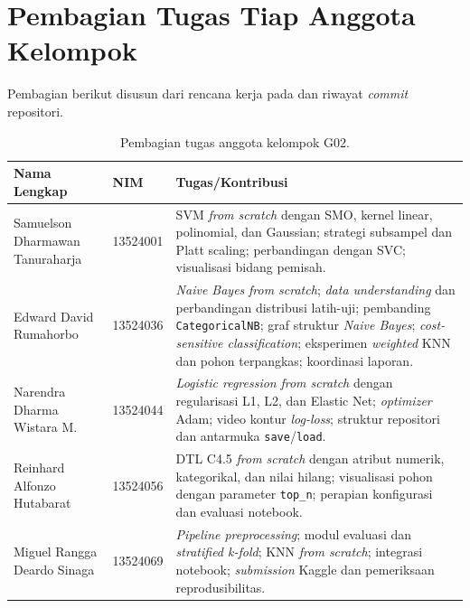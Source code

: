 \pagebreak
\section{Pembagian Tugas Tiap Anggota Kelompok}
Pembagian berikut disusun dari rencana kerja pada  dan riwayat \textit{commit} repositori.
\begin{table}[ht]
    \centering
    \small
    \renewcommand{\arraystretch}{1.4}
    \begin{tabularx}{\textwidth}{@{}p{4.6cm}lX@{}}
        \toprule
        \textbf{Nama Lengkap} & \textbf{NIM} & \textbf{Tugas/Kontribusi} \\
        \midrule
        Samuelson Dharmawan Tanuraharja & 13524001 & SVM \textit{from scratch} dengan SMO, kernel linear, polinomial, dan Gaussian; strategi subsampel dan Platt scaling; perbandingan dengan SVC; visualisasi bidang pemisah. \\
        Edward David Rumahorbo & 13524036 & \textit{Naive Bayes} \textit{from scratch}; \textit{data understanding} dan perbandingan distribusi latih-uji; pembanding \texttt{CategoricalNB}; graf struktur \textit{Naive Bayes}; \textit{cost-sensitive classification}; eksperimen \textit{weighted} KNN dan pohon terpangkas; koordinasi laporan. \\
        Narendra Dharma Wistara M. & 13524044 & \textit{Logistic regression} \textit{from scratch} dengan regularisasi L1, L2, dan Elastic Net; \textit{optimizer} Adam; video kontur \textit{log-loss}; struktur repositori dan antarmuka \texttt{save}/\texttt{load}. \\
        Reinhard Alfonzo Hutabarat & 13524056 & DTL C4.5 \textit{from scratch} dengan atribut numerik, kategorikal, dan nilai hilang; visualisasi pohon dengan parameter \texttt{top\_n}; perapian konfigurasi dan evaluasi notebook. \\
        Miguel Rangga Deardo Sinaga & 13524069 & \textit{Pipeline preprocessing}; modul evaluasi dan \textit{stratified k-fold}; KNN \textit{from scratch}; integrasi notebook; \textit{submission} Kaggle dan pemeriksaan reprodusibilitas. \\
        \bottomrule
    \end{tabularx}
    \caption{Pembagian tugas anggota kelompok G02.}
\end{table}

